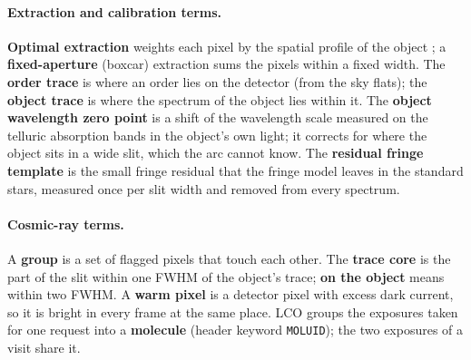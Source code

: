 \paragraph{Extraction and calibration terms.} \textbf{Optimal extraction} weights each pixel by the spatial profile
of the object \citep{Horne1986}; a \textbf{fixed-aperture} (boxcar) extraction sums the pixels within a fixed width.
The \textbf{order trace} is where an order lies on the detector (from the sky flats); the \textbf{object trace} is
where the spectrum of the object lies within it. The \textbf{object wavelength zero point} is a shift of the wavelength
scale measured on the telluric absorption bands in the object's own light; it corrects for where the object sits in a
wide slit, which the arc cannot know. The \textbf{residual fringe template} is the small fringe residual that the
fringe model leaves in the standard stars, measured once per slit width and removed from every spectrum.

\paragraph{Cosmic-ray terms.} A \textbf{group} is a set of flagged pixels that touch each other. The \textbf{trace
core} is the part of the slit within one FWHM of the object's trace; \textbf{on the object} means within two FWHM. A
\textbf{warm pixel} is a detector pixel with excess dark current, so it is bright in every frame at the same place.
LCO groups the exposures taken for one request into a \textbf{molecule} (header keyword \texttt{MOLUID}); the two
exposures of a visit share it.

